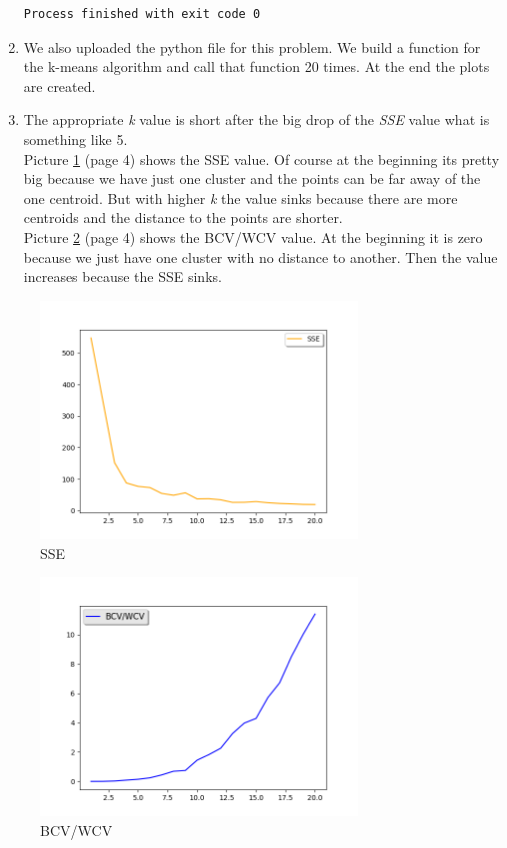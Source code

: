 \documentclass[11pt,a4paper]{scrartcl}
\begin{document}
\begin{enumerate}
\begin{lstlisting}
Process finished with exit code 0
\end{lstlisting}
\item We also uploaded the python file for this problem. We build a function for the k-means algorithm and call that function 20 times. At the end the plots are created.
\item The appropriate \textit{k} value is short after the big drop of the \textit{SSE} value what is something like 5.\\

Picture \ref{sse} (page 4) shows the SSE value. Of course at the beginning its pretty big because we have just one cluster and the points can be far away of the one centroid. But with higher \textit{k} the value sinks because there are more centroids and the distance to the points are shorter.\\

Picture \ref{bcv_wcv} (page 4) shows the BCV/WCV value. At the beginning it is zero because we just have one cluster with no distance to another. Then the value increases because the SSE sinks.
\end{enumerate}

\begin{figure}[htbp] 
  \centering
	\includegraphics[width=0.75\textwidth]{sse.png}
  \caption{SSE}
  \label{sse}
\end{figure}

\begin{figure}[htbp] 
  \centering
	\includegraphics[width=0.75\textwidth]{bcv_wcv.png}
  \caption{BCV/WCV}
  \label{bcv_wcv}
\end{figure}
\end{document}
